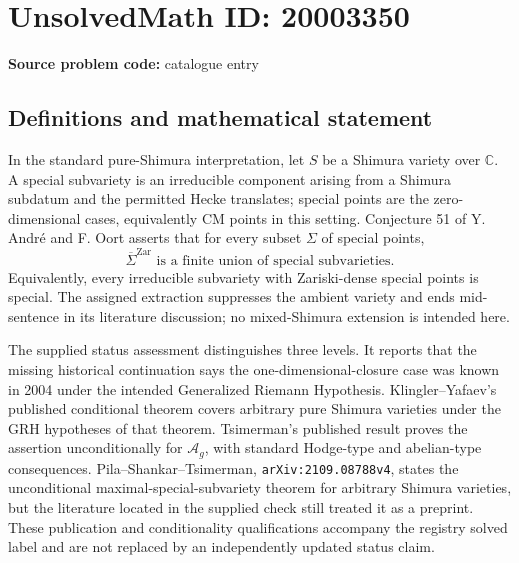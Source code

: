 \documentclass[11pt]{article}
\newcommand{\C}{\mathbb{C}}
\begin{document}
\section*{UnsolvedMath ID: 20003350}
\textbf{Source problem code:} catalogue entry
\subsection{Definitions and mathematical statement}
In the standard pure-Shimura interpretation, let $S$ be a Shimura variety over $\C$. A special subvariety is an irreducible component arising from a Shimura subdatum and the permitted Hecke translates; special points are the zero-dimensional cases, equivalently CM points in this setting. Conjecture 51 of Y. Andr\'e and F. Oort asserts that for every subset $\Sigma$ of special points,
\[
 \overline\Sigma^{\mathrm{Zar}}\text{ is a finite union of special subvarieties}.
\]
Equivalently, every irreducible subvariety with Zariski-dense special points is special. The assigned extraction suppresses the ambient variety and ends mid-sentence in its literature discussion; no mixed-Shimura extension is intended here.

The supplied status assessment distinguishes three levels. It reports that the missing historical continuation says the one-dimensional-closure case was known in 2004 under the intended Generalized Riemann Hypothesis. Klingler--Yafaev's published conditional theorem covers arbitrary pure Shimura varieties under the GRH hypotheses of that theorem. Tsimerman's published result proves the assertion unconditionally for $\mathcal A_g$, with standard Hodge-type and abelian-type consequences. Pila--Shankar--Tsimerman, \texttt{arXiv:2109.08788v4}, states the unconditional maximal-special-subvariety theorem for arbitrary Shimura varieties, but the literature located in the supplied check still treated it as a preprint. These publication and conditionality qualifications accompany the registry solved label and are not replaced by an independently updated status claim.
\end{document}
